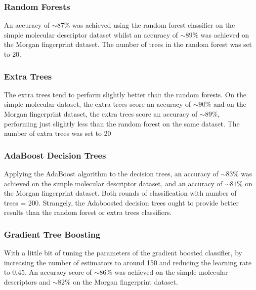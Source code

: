 \documentclass[a4paper,12pt]{report}
\begin{document}
			\subsubsection{Random Forests}
			An accuracy of $\sim87\%$ was achieved using the random forest classifier on the simple molecular descriptor dataset whilst an accuracy of $\sim89\%$ was achieved on the Morgan fingerprint dataset. The number of trees in the random forest was set to 20.
			\subsubsection{Extra Trees}
			The extra trees tend to perform slightly better than the random forests. On the simple molecular dataset, the extra trees score an accuracy of $\sim90\%$ and on the Morgan fingerprint dataset, the extra trees score an accuracy of $\sim89\%$, performing just slightly less than the random forest on the same dataset. The number of extra trees was set to 20
			\subsubsection{AdaBoost Decision Trees}
			Applying the AdaBoost algorithm to the decision trees, an accuracy of $\sim83\%$ was achieved on the simple molecular descriptor dataset, and an accuracy of $\sim81\%$ on the Morgan fingerprint dataset. Both rounds of classification with number of trees = 200. Strangely, the Adaboosted decision trees ought to provide better results than the random forest or extra trees classifiers. 
			\subsubsection{Gradient Tree Boosting}
			With a little bit of tuning the parameters of the gradient boosted classifier, by increasing the number of estimators to around 150 and reducing the learning rate to 0.45. An accuracy score of $\sim86\%$ was achieved on the simple molecular descriptors and $\sim82\%$ on the Morgan fingerprint dataset.
			
\end{document}
